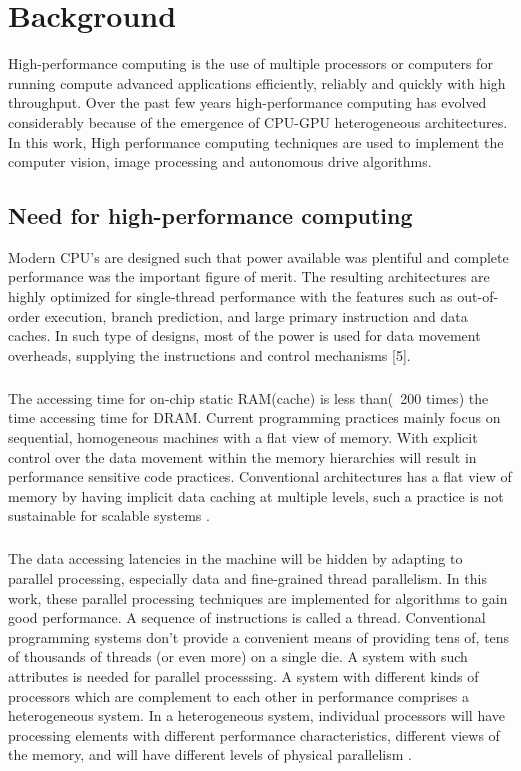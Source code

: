 \chapter{Background}
 High-performance computing is the use of multiple processors or computers for running compute advanced applications efficiently, reliably and quickly with high throughput. Over the past few years high-performance computing has evolved considerably because of the emergence of CPU-GPU heterogeneous architectures. In this work, High performance computing techniques are used to implement the computer vision, image processing and autonomous drive algorithms.
\section{Need for high-performance computing}
Modern CPU's are designed such that power available was plentiful and complete performance was the important figure of merit. The resulting architectures are highly optimized for single-thread performance with the features such as out-of-order execution, branch prediction, and large primary instruction and data caches. In such type of designs, most of the power is used for data movement overheads, supplying the instructions and control mechanisms [5].\paragraph*{} The accessing time for on-chip static RAM(cache) is less than(~200 times) the time accessing time for DRAM. Current programming practices mainly focus on sequential, homogeneous machines with a flat view of memory. With explicit control over the data movement within the memory hierarchies will result in performance sensitive code practices. Conventional architectures has a flat view of memory by having implicit data caching at multiple levels, such a practice is not sustainable for scalable systems \cite{ProfessionalCUDA}.
\paragraph*{} The data accessing latencies in the machine will be hidden by adapting to parallel processing, especially data and fine-grained thread parallelism. In this work, these parallel processing techniques are implemented for algorithms to gain good performance. A sequence of instructions is called a thread. Conventional programming systems don't provide a convenient means of providing tens of, tens of thousands of threads (or even more) on a single die. A system with such attributes is needed for parallel processsing. A system with different kinds of processors which are complement to each other in performance comprises a heterogeneous system. In a heterogeneous system, individual processors will have processing elements with different performance characteristics, different views of the memory, and will have different levels of physical parallelism \cite{ProfessionalCUDA}. 
